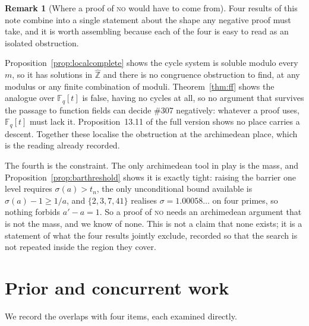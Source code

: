 \documentclass[11pt]{article}
\theoremstyle{definition}
\newtheorem{remark}[theorem]{Remark}
\begin{document}
\begin{remark}[Where a proof of \textsc{no} would have to come from]\label{rem:whereleft}
Four results of this note combine into a single statement about the shape any negative proof must
take, and it is worth assembling because each of the four is easy to read as an isolated obstruction.

Proposition~\ref{prop:localcomplete} shows the cycle system is soluble modulo every $m$, so it has
solutions in $\widehat{\mathbb{Z}}$ and there is no congruence obstruction to find, at any modulus or
any finite combination of moduli. Theorem~\ref{thm:ff} shows the analogue over $\mathbb{F}_q[t]$ is
false, having no cycles at all, so no argument that survives the passage to function fields can
decide \#307 negatively: whatever a proof uses, $\mathbb{F}_q[t]$ must lack it.
Proposition~13.11 of the full version shows no place carries a descent. Together these localise the
obstruction at the archimedean place, which is the reading already recorded.

The fourth is the constraint. The only archimedean tool in play is the mass, and
Proposition~\ref{prop:barthreshold} shows it is exactly tight: raising the barrier one level requires
$\sigma(a)>t_n$, the only unconditional bound available is $\sigma(a)-1\ge1/a$, and
$\{2,3,7,41\}$ realises $\sigma=1.00058\ldots$ on four primes, so nothing forbids $a'-a=1$. So a
proof of \textsc{no} needs an archimedean argument that is not the mass, and we know of none. This is
not a claim that none exists; it is a statement of what the four results jointly exclude, recorded so
that the search is not repeated inside the region they cover.
\end{remark}

\section{Prior and concurrent work}\label{sec:prior}

We record the overlaps with four items, each examined directly.
\end{document}
